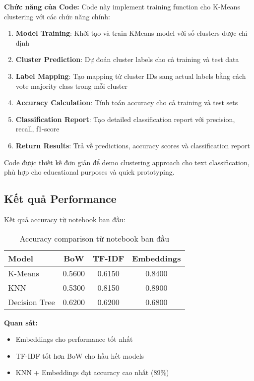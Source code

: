 \textbf{Chức năng của Code:}
Code này implement training function cho K-Means clustering với các chức năng chính:

\begin{enumerate}
    \item \textbf{Model Training}: Khởi tạo và train KMeans model với số clusters được chỉ định
    
    \item \textbf{Cluster Prediction}: Dự đoán cluster labels cho cả training và test data
    
    \item \textbf{Label Mapping}: Tạo mapping từ cluster IDs sang actual labels bằng cách vote majority class trong mỗi cluster
    
    \item \textbf{Accuracy Calculation}: Tính toán accuracy cho cả training và test sets
    
    \item \textbf{Classification Report}: Tạo detailed classification report với precision, recall, f1-score
    
    \item \textbf{Return Results}: Trả về predictions, accuracy scores và classification report
\end{enumerate}

Code được thiết kế đơn giản để demo clustering approach cho text classification, phù hợp cho educational purposes và quick prototyping.

\subsection{Kết quả Performance}

Kết quả accuracy từ notebook ban đầu:

\begin{table}[H]
\centering
\begin{tabular}{|l|c|c|c|}
\hline
\textbf{Model} & \textbf{BoW} & \textbf{TF-IDF} & \textbf{Embeddings} \\
\hline
K-Means & 0.5600 & 0.6150 & 0.8400 \\
KNN & 0.5300 & 0.8150 & 0.8900 \\
Decision Tree & 0.6200 & 0.6200 & 0.6800 \\
\hline
\end{tabular}
\caption{Accuracy comparison từ notebook ban đầu}
\end{table}

\textbf{Quan sát:}
\begin{itemize}
    \item Embeddings cho performance tốt nhất
    \item TF-IDF tốt hơn BoW cho hầu hết models
    \item KNN + Embeddings đạt accuracy cao nhất (89\%)
\end{itemize}

